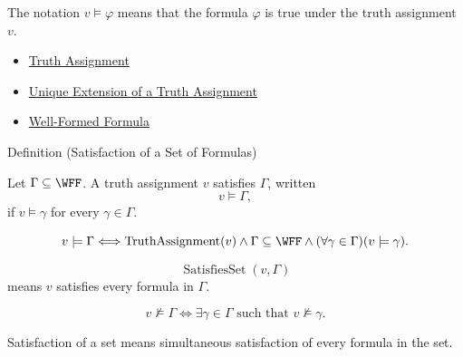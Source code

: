 \begin{remark*}[Interpretation]
The notation \(v\models\varphi\) means that the formula \(\varphi\) is true under the truth assignment \(v\).
\end{remark*}

\begin{dependencies}
\begin{itemize}
  \item \hyperref[def:truth-assignment-propositional-logic]{Truth Assignment}
  \item \hyperref[thm:unique-extension-truth-assignment-propositional-logic]{Unique Extension of a Truth Assignment}
  \item \hyperref[def:well-formed-formula]{Well-Formed Formula}
\end{itemize}
\end{dependencies}
\begin{definitionbox}{Definition (Satisfaction of a Set of Formulas)}
\begin{definition}
\label{def:satisfaction-set-propositional-logic}
Let \(\Gamma\subseteq\WFF\). A truth assignment \(v\) satisfies \(\Gamma\), written
\[
v\models\Gamma,
\]
if \(v\models\gamma\) for every \(\gamma\in\Gamma\).
\end{definition}
\end{definitionbox}

\begin{remark*}
\[
v\models\Gamma
\Longleftrightarrow
\operatorname{TruthAssignment}(v)
\land
\Gamma\subseteq\WFF
\land
(\forall\gamma\in\Gamma)(v\models\gamma).
\]
\end{remark*}

\begin{remark*}
\[
\operatorname{SatisfiesSet}(v,\Gamma)
\]
means \(v\) satisfies every formula in \(\Gamma\).
\end{remark*}

\begin{remark*}
\[
v\not\models\Gamma
\Longleftrightarrow
\exists\gamma\in\Gamma\text{ such that }v\not\models\gamma.
\]
\end{remark*}

\begin{remark*}[Interpretation]
Satisfaction of a set means simultaneous satisfaction of every formula in the set.
\end{remark*}

